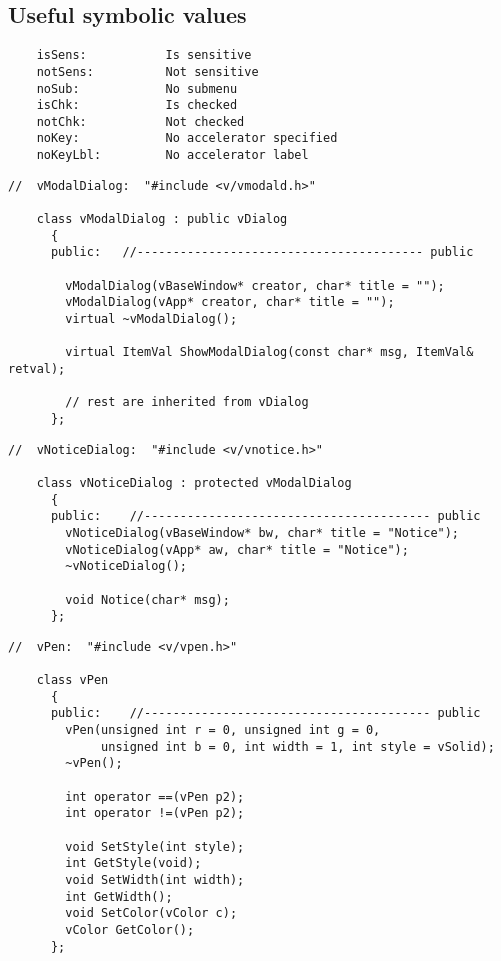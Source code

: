 \subsection*{Useful symbolic values}

\footnotesize
\begin{verbatim}
    isSens:           Is sensitive
    notSens:          Not sensitive
    noSub:            No submenu
    isChk:            Is checked
    notChk:           Not checked
    noKey:            No accelerator specified
    noKeyLbl:         No accelerator label
\end{verbatim}
\normalfont\normalsize

\footnotesize
\begin{verbatim}
//  vModalDialog:  "#include <v/vmodald.h>"

    class vModalDialog : public vDialog
      {
      public:   //---------------------------------------- public

        vModalDialog(vBaseWindow* creator, char* title = "");
        vModalDialog(vApp* creator, char* title = "");
        virtual ~vModalDialog();

        virtual ItemVal ShowModalDialog(const char* msg, ItemVal& retval);

        // rest are inherited from vDialog
      };
\end{verbatim}
\normalfont\normalsize


\footnotesize
\begin{verbatim}
//  vNoticeDialog:  "#include <v/vnotice.h>"

    class vNoticeDialog : protected vModalDialog
      {
      public:    //---------------------------------------- public
        vNoticeDialog(vBaseWindow* bw, char* title = "Notice");
        vNoticeDialog(vApp* aw, char* title = "Notice");
        ~vNoticeDialog();

        void Notice(char* msg);
      };
\end{verbatim}
\normalfont\normalsize


\footnotesize
\begin{verbatim}
//  vPen:  "#include <v/vpen.h>"

    class vPen
      {
      public:    //---------------------------------------- public
        vPen(unsigned int r = 0, unsigned int g = 0,
             unsigned int b = 0, int width = 1, int style = vSolid);
        ~vPen();

        int operator ==(vPen p2);
        int operator !=(vPen p2);

        void SetStyle(int style);
        int GetStyle(void);
        void SetWidth(int width);
        int GetWidth();
        void SetColor(vColor c);
        vColor GetColor();
      };
\end{verbatim}
\normalfont\normalsize


